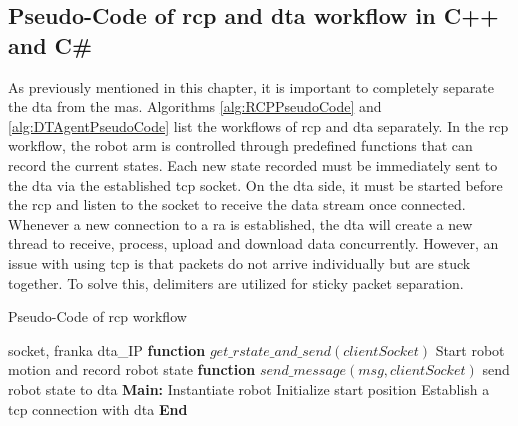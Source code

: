 \subsection{Pseudo-Code of \gls{rcp} and \gls{dta} workflow in C++ and C\#}\label{chap: RCPDTAPseudo}

As previously mentioned in this chapter, it is important to completely separate the 
\gls{dta} from the \gls{mas}. Algorithms \ref{alg:RCPPseudoCode} and 
\ref{alg:DTAgentPseudoCode} list the workflows of \gls{rcp} and \gls{dta} separately. 
In the \gls{rcp} workflow, the robot arm is controlled through predefined functions 
that can record the current states. Each new state recorded must be immediately sent 
to the \gls{dta} via the established \gls{tcp} socket. 
On the \gls{dta} side, it must be started before the \gls{rcp} and listen to the 
socket to receive the data stream once connected. Whenever a new connection to a 
\gls{ra} is established, the \gls{dta} will create a new thread to receive, process, 
upload and download data concurrently. 
However, an issue with using \gls{tcp} is that packets do not arrive individually 
but are stuck together. To solve this, delimiters are utilized for sticky packet separation.

\begin{breakablealgorithm}
    \caption{Pseudo-Code of \gls{rcp} workflow}
    \label{alg:RCPPseudoCode}
    \begin{algorithmic}
     socket, franka
     \gls{dta}\_IP
    \State \textbf{function} {$get\_rstate\_and\_send(clientSocket)$}
        \State \qquad Start robot motion and record robot state
        \State {}
    \State \textbf{function} {$send\_message(msg, clientSocket)$}
        \State \qquad send robot state to \gls{dta} 
    \State \textbf{Main:}
    \State \qquad Instantiate robot
    \State \qquad Initialize start position
    \State \qquad Establish a \gls{tcp} connection with \gls{dta}  
    \State {}
    \State \textbf{End}
    \end{algorithmic}
\end{breakablealgorithm}


